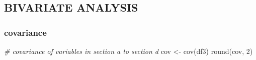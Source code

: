 \documentclass[
]{article}
\newenvironment{Shaded}{\begin{snugshade}}{\end{snugshade}}
\newcommand{\CommentTok}[1]{\textcolor[rgb]{0.56,0.35,0.01}{\textit{#1}}}
\newcommand{\DecValTok}[1]{\textcolor[rgb]{0.00,0.00,0.81}{#1}}
\newcommand{\FunctionTok}[1]{\textcolor[rgb]{0.00,0.00,0.00}{#1}}
\newcommand{\NormalTok}[1]{#1}
\newcommand{\OtherTok}[1]{\textcolor[rgb]{0.56,0.35,0.01}{#1}}
\begin{document}
\hypertarget{bivariate-analysis}{%
\subsection{BIVARIATE ANALYSIS}\label{bivariate-analysis}}

\hypertarget{covariance}{%
\subsubsection{covariance}\label{covariance}}

\begin{Shaded}
\begin{Highlighting}[]
\CommentTok{\# covariance of variables in section a to section d}
\NormalTok{cov }\OtherTok{\textless{}{-}} \FunctionTok{cov}\NormalTok{(df3)}
\FunctionTok{round}\NormalTok{(cov, }\DecValTok{2}\NormalTok{)}
\end{Highlighting}
\end{Shaded}
\end{document}
